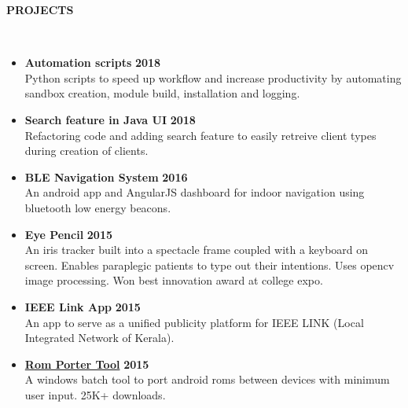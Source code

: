 \documentclass[a4paper,10pt]{article}
\newcommand{\lsep}{-0.5cm}
\newcommand{\resheading}[1]{{\small \colorbox{mygrey}{\begin{minipage}{0.975\textwidth}{\textbf{\uppercase{#1} \vphantom{p\^{E}}}}\end{minipage}}}}
\newcommand{\when}[1]{\hfill \textbf{#1}}
\newenvironment{noSepItemize}
{ \begin{itemize}
    \setlength{\itemsep}{1pt}
    \setlength{\parskip}{0pt}
    \setlength{\parsep}{0pt}     }
{ \end{itemize}                  }
\begin{document}
\resheading{\textbf{PROJECTS} }\\[\lsep]
\begin{noSepItemize}
\item \textbf{Automation scripts} \when{2018}\\
	Python scripts to speed up workflow and increase productivity by automating sandbox creation, module build, installation and logging. 
\item \textbf{Search feature in Java UI} \when{2018}\\
Refactoring code and adding search feature to easily retreive client types during creation of clients.
\item \textbf{BLE Navigation System} \when{2016}\\
	An android app and AngularJS dashboard for indoor navigation using bluetooth low energy beacons. 
\item \textbf{Eye Pencil} \when{2015}\\
	An iris tracker built into a spectacle frame coupled with a keyboard on screen. Enables paraplegic patients to type out their intentions. Uses opencv image processing. Won best innovation award at college expo.
\item \textbf{IEEE Link App} \when{2015}\\
	An app to serve as a unified publicity platform for IEEE LINK (Local Integrated Network of Kerala). 
\item \textbf{\href{http://forum.xda-developers.com/showthread.php?t=2276871}{Rom Porter Tool}} \when{2015}\\
	A windows batch tool to port android roms between devices with minimum user input. 25K+ downloads.
\end{noSepItemize}
\end{document}
